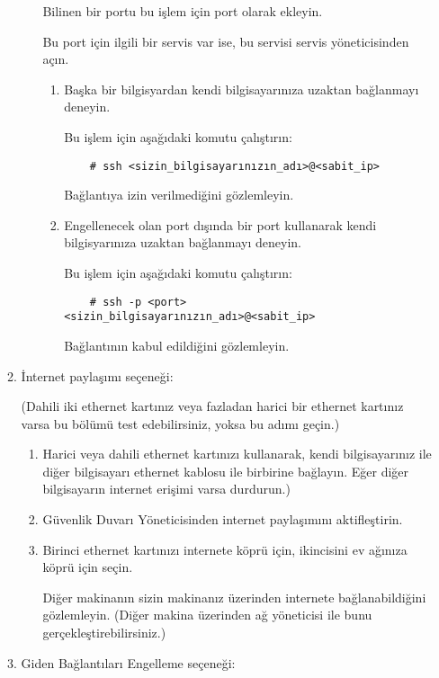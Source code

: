 \documentclass[a4paper,10pt]{article}
\begin{document}
\begin{enumerate}
\begin{enumerate}
\begin{enumerate}
	Bilinen bir portu bu işlem için port olarak ekleyin.

	Bu port için ilgili bir servis var ise, bu servisi servis yöneticisinden açın.

        \begin{enumerate}
            \item Başka bir bilgisyardan kendi bilgisayarınıza uzaktan bağlanmayı deneyin.

	Bu işlem için aşağıdaki komutu çalıştırın:
	\begin{verbatim}
	# ssh <sizin_bilgisayarınızın_adı>@<sabit_ip>
	\end{verbatim}
	Bağlantıya izin verilmediğini gözlemleyin.

       \item Engellenecek olan port dışında bir port kullanarak kendi bilgisyarınıza uzaktan bağlanmayı deneyin.

	Bu işlem için aşağıdaki komutu çalıştırın:
	\begin{verbatim}
	# ssh -p <port> <sizin_bilgisayarınızın_adı>@<sabit_ip>
	\end{verbatim}
                 Bağlantının kabul edildiğini gözlemleyin.
        \end{enumerate}
    \end{enumerate}
    \item İnternet paylaşımı seçeneği: 

	(Dahili iki ethernet kartınız veya fazladan harici bir ethernet kartınız varsa bu bölümü test edebilirsiniz, yoksa bu adımı geçin.)

        \begin{enumerate}
        \item Harici veya dahili ethernet kartınızı kullanarak, kendi bilgisayarınız ile diğer bilgisayarı ethernet kablosu ile birbirine bağlayın. Eğer diğer bilgisayarın internet erişimi varsa durdurun.)

        \item Güvenlik Duvarı Yöneticisinden internet paylaşımını aktifleştirin.

        \item Birinci ethernet kartınızı internete köprü için, ikincisini ev ağınıza köprü için seçin.

              Diğer makinanın sizin makinanız üzerinden internete bağlanabildiğini gözlemleyin. (Diğer makina üzerinden ağ yöneticisi ile bunu gerçekleştirebilirsiniz.) 
        \end{enumerate}
    \item Giden Bağlantıları Engelleme seçeneği:


\end{enumerate}
\end{enumerate}
\end{document}
